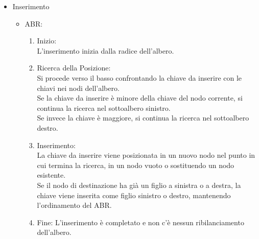 \begin{itemize}
    \item Inserimento
    \begin{itemize}
        \item ABR: 
        \begin{enumerate}
            \item Inizio:\\
                L'inserimento inizia dalla radice dell'albero.
            \item Ricerca della Posizione:\\
                Si procede verso il basso confrontando la chiave da inserire con le chiavi nei nodi dell'albero.\\
                Se la chiave da inserire è minore della chiave del nodo corrente, si continua la ricerca nel sottoalbero sinistro.\\
                Se invece la chiave è maggiore, si continua la ricerca nel sottoalbero destro.
            \item Inserimento:\\
                La chiave da inserire viene posizionata in un nuovo nodo nel punto in cui termina la ricerca, in un nodo vuoto o sostituendo un nodo esistente.\\
                Se il nodo di destinazione ha già un figlio a sinistra o a destra, la chiave viene inserita come figlio sinistro o destro, mantenendo l'ordinamento del ABR.
            \item Fine:
                L'inserimento è completato e non c'è nessun ribilanciamento dell'albero.
        \end{enumerate}
    

\end{itemize}
\end{itemize}

